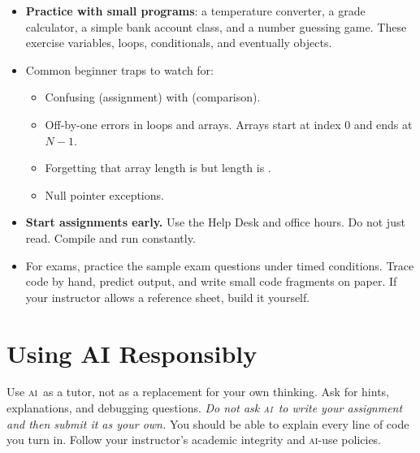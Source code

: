 \documentclass[%
 reprint,
 amsmath,amssymb,
 aps,
]{revtex4-2}
\newcommand{\AI}{\textsc{ai}}
\begin{document}
\begin{itemize}
	\item
	\textbf{Practice with small programs}: 
	a temperature converter, 
	a grade calculator, 
	a simple bank account class, and 
	a number guessing game. 
	These exercise variables, loops, conditionals, and eventually objects.
	
	\item
	Common beginner traps to watch for:
	
	\begin{itemize}
		
		\item 
		Confusing \code{=} (assignment) with \code{==} (comparison).
		
		\item 
		Off-by-one errors in loops and arrays. 
		Arrays start at index 0 and ends at $N - 1$.
		
		\item 
		Forgetting that array length is  but 
		 length is .
		
		\item 
		Null pointer exceptions.
	
		
	\end{itemize}

	\item
	\textbf{Start assignments early.} 
	Use the Help Desk and office hours. 
	Do not just read. Compile and run constantly.
	
	\item
	For exams, practice the sample exam questions under timed conditions. 
	Trace code by hand, predict output, and write small code fragments on paper. 
	If your instructor allows a reference sheet, build it yourself.

\end{itemize}




\section{Using AI Responsibly}

Use \AI\ as a tutor, not as a replacement for your own thinking. 
Ask for hints, explanations, and debugging questions. 
\emph{Do not ask \AI\ to write your assignment and then submit it as your own.} 
You should be able to explain every line of code you turn in. 
Follow your instructor’s academic integrity and \AI-use policies.




\end{document}
